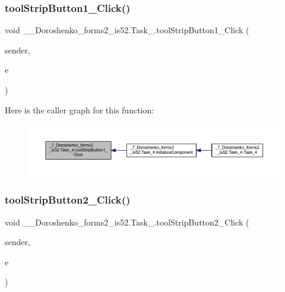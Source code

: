\subsubsection{\texorpdfstring{tool\+Strip\+Button1\+\_\+\+Click()}{toolStripButton1\_Click()}}
{\footnotesize\ttfamily void \+\_\+\_\+\+Doroshenko\+\_\+forms2\+\_\+is52.\+Task\+\_.\+tool\+Strip\+Button1\+\_\+\+Click (\begin{DoxyParamCaption}\item[{object}]{sender,  }\item[{Event\+Args}]{e }\end{DoxyParamCaption})\hspace{0.3cm}{\ttfamily [private]}}

Here is the caller graph for this function\+:
\nopagebreak
\begin{figure}[H]
\begin{center}
\leavevmode
\includegraphics[width=350pt]{class__7___doroshenko__forms2__is52_1_1_task__4_aba2d8d643ee983311563a099f5f0ac12_icgraph}
\end{center}
\end{figure}
\hypertarget{class__7___doroshenko__forms2__is52_1_1_task__4_af5d8fcef07a2c9695104b7036a2e423a}{}\label{class__7___doroshenko__forms2__is52_1_1_task__4_af5d8fcef07a2c9695104b7036a2e423a} 
\subsubsection{\texorpdfstring{tool\+Strip\+Button2\+\_\+\+Click()}{toolStripButton2\_Click()}}
{\footnotesize\ttfamily void \+\_\+\_\+\+Doroshenko\+\_\+forms2\+\_\+is52.\+Task\+\_.\+tool\+Strip\+Button2\+\_\+\+Click (\begin{DoxyParamCaption}\item[{object}]{sender,  }\item[{Event\+Args}]{e }\end{DoxyParamCaption})\hspace{0.3cm}{\ttfamily [private]}}

